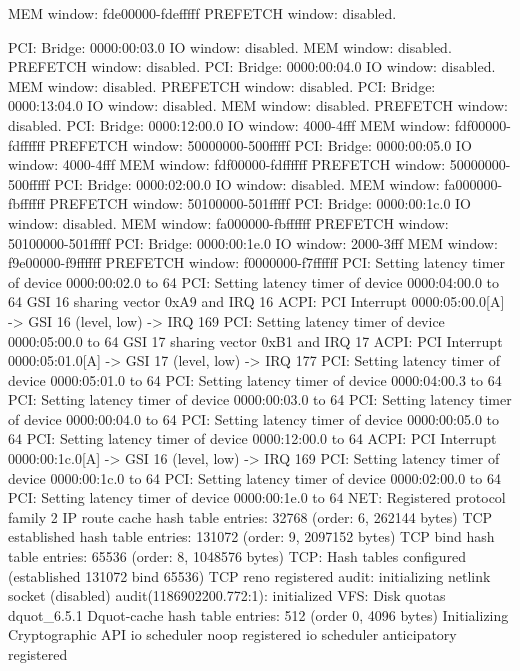 \documentclass[mingoth,a4paper]{jsarticle}
\begin{document}
{{{{{{{{{{{{{{{{{\begin{commandline}
  MEM window: fde00000-fdefffff
  PREFETCH window: disabled.
\end{commandline}
\begin{commandline}
PCI: Bridge: 0000:00:03.0
  IO window: disabled.
  MEM window: disabled.
  PREFETCH window: disabled.
PCI: Bridge: 0000:00:04.0
  IO window: disabled.
  MEM window: disabled.
  PREFETCH window: disabled.
PCI: Bridge: 0000:13:04.0
  IO window: disabled.
  MEM window: disabled.
  PREFETCH window: disabled.
PCI: Bridge: 0000:12:00.0
  IO window: 4000-4fff
  MEM window: fdf00000-fdffffff
  PREFETCH window: 50000000-500fffff
PCI: Bridge: 0000:00:05.0
  IO window: 4000-4fff
  MEM window: fdf00000-fdffffff
  PREFETCH window: 50000000-500fffff
PCI: Bridge: 0000:02:00.0
  IO window: disabled.
  MEM window: fa000000-fbffffff
  PREFETCH window: 50100000-501fffff
PCI: Bridge: 0000:00:1c.0
  IO window: disabled.
  MEM window: fa000000-fbffffff
  PREFETCH window: 50100000-501fffff
PCI: Bridge: 0000:00:1e.0
  IO window: 2000-3fff
  MEM window: f9e00000-f9ffffff
  PREFETCH window: f0000000-f7ffffff
PCI: Setting latency timer of device 0000:00:02.0 to 64
PCI: Setting latency timer of device 0000:04:00.0 to 64
GSI 16 sharing vector 0xA9 and IRQ 16
ACPI: PCI Interrupt 0000:05:00.0[A] -> GSI 16 (level, low) -> IRQ 169
PCI: Setting latency timer of device 0000:05:00.0 to 64
GSI 17 sharing vector 0xB1 and IRQ 17
ACPI: PCI Interrupt 0000:05:01.0[A] -> GSI 17 (level, low) -> IRQ 177
PCI: Setting latency timer of device 0000:05:01.0 to 64
PCI: Setting latency timer of device 0000:04:00.3 to 64
PCI: Setting latency timer of device 0000:00:03.0 to 64
PCI: Setting latency timer of device 0000:00:04.0 to 64
PCI: Setting latency timer of device 0000:00:05.0 to 64
PCI: Setting latency timer of device 0000:12:00.0 to 64
ACPI: PCI Interrupt 0000:00:1c.0[A] -> GSI 16 (level, low) -> IRQ 169
PCI: Setting latency timer of device 0000:00:1c.0 to 64
PCI: Setting latency timer of device 0000:02:00.0 to 64
PCI: Setting latency timer of device 0000:00:1e.0 to 64
NET: Registered protocol family 2
IP route cache hash table entries: 32768 (order: 6, 262144 bytes)
TCP established hash table entries: 131072 (order: 9, 2097152 bytes)
TCP bind hash table entries: 65536 (order: 8, 1048576 bytes)
TCP: Hash tables configured (established 131072 bind 65536)
TCP reno registered
audit: initializing netlink socket (disabled)
audit(1186902200.772:1): initialized
VFS: Disk quotas dquot_6.5.1
Dquot-cache hash table entries: 512 (order 0, 4096 bytes)
Initializing Cryptographic API
io scheduler noop registered
io scheduler anticipatory registered

\end{commandline}}}}}}}}}}}}}}}}}}
\end{document}
